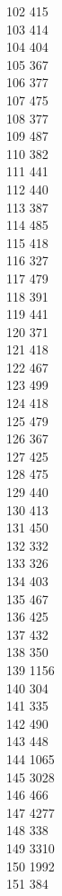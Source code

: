 { 102	415 \\
 103	414 \\
 104	404 \\
 105	367 \\
 106	377 \\
 107	475 \\
 108	377 \\
 109	487 \\
 110	382 \\
 111	441 \\
 112	440 \\
 113	387 \\
 114	485 \\
 115	418 \\
 116	327 \\
 117	479 \\
 118	391 \\
 119	441 \\
 120	371 \\
 121	418 \\
 122	467 \\
 123	499 \\
 124	418 \\
 125	479 \\
 126	367 \\
 127	425 \\
 128	475 \\
 129	440 \\
 130	413 \\
 131	450 \\
 132	332 \\
 133	326 \\
 134	403 \\
 135	467 \\
 136	425 \\
 137	432 \\
 138	350 \\
 139	1156 \\
 140	304 \\
 141	335 \\
 142	490 \\
 143	448 \\
 144	1065 \\
 145	3028 \\
 146	466 \\
 147	4277 \\
 148	338 \\
 149	3310 \\
 150	1992 \\
 151	384 \\
}

